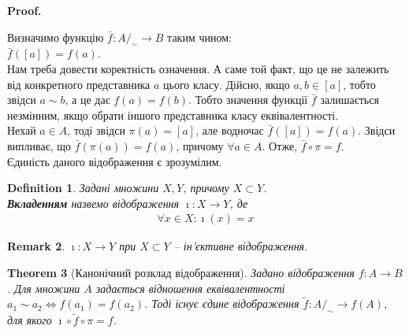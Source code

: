 \documentclass[a4paper, 14pt]{extarticle}
\makeatletter
\theoremstyle{theoremdd}
\newtheorem{theorem}{Theorem}[subsection]
\theoremstyle{theoremdd}
\newtheorem{definition}[theorem]{Definition}
\theoremstyle{theoremdd}
\theoremstyle{theoremdd}
\theoremstyle{theoremdd}
\theoremstyle{theoremdd}
\theoremstyle{theoremdd}
\theoremstyle{theoremdd}
\theoremstyle{theoremdd}
\theoremstyle{theoremdd}
\theoremstyle{theoremdd}
\newtheorem{remark}[theorem]{Remark}
\theoremstyle{theoremdd}
\theoremstyle{theoremdd}
\theoremstyle{theoremdd}
\theoremstyle{theoremdd}
\renewenvironment{proof}[1][Proof.\\]{\par
\pushQED{\hfill \qed}%
\normalfont \topsep6\p@\@plus6\p@\relax
\trivlist
\item\relax
{\bfseries
#1\@addpunct{.}}\hspace\labelsep\ignorespaces
}{%
\popQED\endtrivlist\@endpefalse
}
\makeatother
\begin{document}
\begin{proof}
Визначимо функцію $\bar{f} \colon A/_\sim \to B$ таким чином:\\
$\bar{f}([a]) = f(a)$.\\
Нам треба довести коректність означення. А саме той факт, що це не залежить від конкретного представника $a$ цього класу. Дійсно, якщо $a,b \in [a]$, тобто звідси $a \sim b$, а це дає $f(a) = f(b)$. Тобто значення функції $\bar{f}$ залишається незмінним, якщо обрати іншого представника класу еквівалентності.\\
Нехай $a \in A$, тоді звідси $\pi(a) = [a]$, але водночас $\bar{f}([a]) = f(a)$. Звідси випливає, що $\bar{f}(\pi(a)) = f(a)$, причому $\forall a \in A$. Отже, $\bar{f} \circ \pi = f$.\\
Єдиність даного відображення є зрозумілим.
\end{proof}

\begin{definition}
Задані множини $X,Y$, причому $X \subset Y$.\\
\textbf{Вкладенням} назвемо відображення $\imath \colon X \to Y$, де
\begin{align*}
\forall x \in X: \imath(x) = x
\end{align*}
\end{definition}

\begin{remark}
$\imath \colon X \to Y$ при $X \subset Y$ -- ін'єктивне відображення.
\end{remark}

\begin{theorem}[Канонічний розклад відображення]
Задано відображення $f \colon A \to B$. Для множини $A$ задається відношення еквівалентності $a_1 \sim a_2 \iff f(a_1) = f(a_2)$. Тоді існує єдине відображення $\tilde{f} \colon A/_\sim \to f(A)$, для якого $\imath \circ \tilde{f} \circ \pi = f$.
\begin{figure}[H]
\centering
{}
\end{figure}
\end{theorem}
\end{document}
